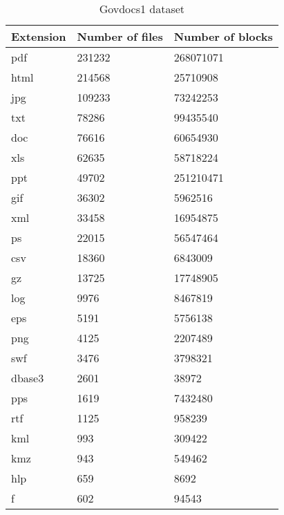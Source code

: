 \begin{table}[!ht]
    \centering
    \caption{Govdocs1 dataset}
    \label{tab:govdocs1}
\begin{tabular}{|l|l|l|}
\hline
Extension & Number of files & Number of blocks \\ \hline
                                                  \hline
pdf       & 231232          & 268071071    \\ \hline
html      & 214568          & 25710908     \\ \hline
jpg       & 109233          & 73242253     \\ \hline
txt       & 78286           & 99435540     \\ \hline
doc       & 76616           & 60654930     \\ \hline
xls       & 62635           & 58718224     \\ \hline
ppt       & 49702           & 251210471    \\ \hline
gif       & 36302           & 5962516      \\ \hline
xml       & 33458           & 16954875     \\ \hline
ps        & 22015           & 56547464     \\ \hline
csv       & 18360           & 6843009      \\ \hline
gz        & 13725           & 17748905     \\ \hline
log       & 9976            & 8467819      \\ \hline
eps       & 5191            & 5756138      \\ \hline
png       & 4125            & 2207489      \\ \hline
swf       & 3476            & 3798321      \\ \hline
dbase3    & 2601            & 38972        \\ \hline
pps       & 1619            & 7432480      \\ \hline
rtf       & 1125            & 958239       \\ \hline
kml       & 993             & 309422       \\ \hline
kmz       & 943             & 549462       \\ \hline
hlp       & 659             & 8692         \\ \hline
f         & 602             & 94543        \\ \hline

\end{tabular}
\end{table}
